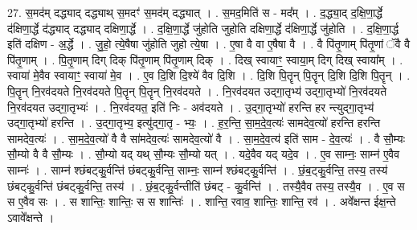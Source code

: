 \documentclass[17pt]{extarticle}
\begin{document}
27. स॒मद॑म् दद्ध्याद् दद्ध्याथ् स॒मदꣳ॑ स॒मद॑म् दद्ध्यात् । . स॒मद॒मिति॑ स - मद᳚म् । . द॒द्ध्या॒द् द॒क्षि॒णा॒र्द्धे द॑क्षिणा॒र्द्धे द॑द्ध्याद् दद्ध्याद् दक्षिणा॒र्द्धे । . द॒क्षि॒णा॒र्द्धे जु॑होति जुहोति दक्षिणा॒र्द्धे द॑क्षिणा॒र्द्धे जु॑होति । . द॒क्षि॒णा॒र्द्ध इति॑ दक्षिण - अ॒र्द्धे । . जु॒हो॒ त्ये॒षैषा जु॑होति जुहो त्ये॒षा । . ए॒षा वै वा ए॒षैषा वै । . वै पि॑तृ॒णाम् पि॑तृ॒णां ॅवै वै पि॑तृ॒णाम् । . पि॒तृ॒णाम् दिग् दिक् पि॑तृ॒णाम् पि॑तृ॒णाम् दिक् । . दिख् स्वायाꣳ॒॒ स्वाया॒म् दिग् दिख् स्वाया᳚म् । . स्वाया॑ मे॒वैव स्वायाꣳ॒॒ स्वाया॑ मे॒व । . ए॒व दि॒शि दि॒श्ये॑ वैव दि॒शि । . दि॒शि पि॒तॄन् पि॒तॄन् दि॒शि दि॒शि पि॒तॄन् । . पि॒तॄन् नि॒रव॑दयते नि॒रव॑दयते पि॒तॄन् पि॒तॄन् नि॒रव॑दयते । . नि॒रव॑दयत उद्‍गा॒तृभ्य॑ उद्‍गा॒तृभ्यो॑ नि॒रव॑दयते नि॒रव॑दयत उद्‍गा॒तृभ्यः॑ । . नि॒रव॑दयत॒ इति॑ निः - अव॑दयते । . उ॒द्‍गा॒तृभ्यो॑ हरन्ति हर न्त्युद्‍गा॒तृभ्य॑ उद्‍गा॒तृभ्यो॑ हरन्ति । . उ॒द्‍गा॒तृभ्य॒ इत्यु॑द्‍गा॒तृ - भ्यः॒ । . ह॒र॒न्ति॒ सा॒म॒दे॒व॒त्यः॑ सामदेव॒त्यो॑ हरन्ति हरन्ति सामदेव॒त्यः॑ । . सा॒म॒दे॒व॒त्यो॑ वै वै सा॑मदेव॒त्यः॑ सामदेव॒त्यो॑ वै । . सा॒म॒दे॒व॒त्य॑ इति॑ साम - दे॒व॒त्यः॑ । . वै सौ॒म्यः सौ॒म्यो वै वै सौ॒म्यः । . सौ॒म्यो यद् यथ् सौ॒म्यः सौ॒म्यो यत् । . यदे॒वैव यद् यदे॒व । . ए॒व साम्नः॒ साम्न॑ ए॒वैव साम्नः॑ । . साम्न॑ श्छंबट्कु॒र्वन्ति॑ छंबट्कु॒र्वन्ति॒ साम्नः॒ साम्न॑ श्छंबट्कु॒र्वन्ति॑ । . छं॒ब॒ट्कु॒र्वन्ति॒ तस्य॒ तस्य॑ छंबट्कु॒र्वन्ति॑ छंबट्कु॒र्वन्ति॒ तस्य॑ । . छं॒ब॒ट्कु॒र्वन्तीति॑ छंबट् - कु॒र्वन्ति॑ । . तस्यै॒वैव तस्य॒ तस्यै॒व । . ए॒व स स ए॒वैव सः । . स शान्तिः॒ शान्तिः॒ स स शान्तिः॑ । . शान्ति॒ रवाव॒ शान्तिः॒ शान्ति॒ रव॑ । . अवे᳚क्षन्त ईक्ष॒न्ते ऽवावे᳚क्षन्ते । \newline
\end{document}
